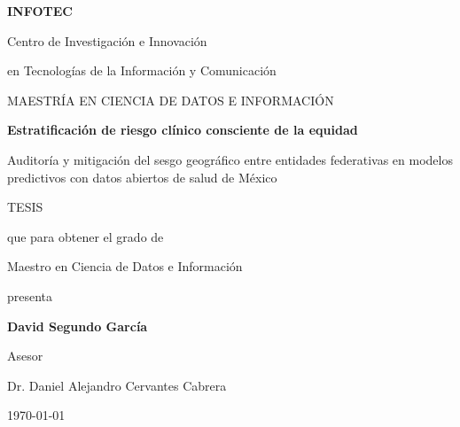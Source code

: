 \begin{titlepage}
\centering
\vspace*{0.8cm}

{\large\bfseries INFOTEC\par}
\vspace{0.2cm}
{\normalsize Centro de Investigación e Innovación\par}
{\normalsize en Tecnologías de la Información y Comunicación\par}
\vspace{1.1cm}
{\large MAESTRÍA EN CIENCIA DE DATOS E INFORMACIÓN\par}
\vspace{1.1cm}

{\LARGE\bfseries Estratificación de riesgo clínico consciente de la equidad\par}
\vspace{0.6cm}
{\large Auditoría y mitigación del sesgo geográfico entre entidades federativas
en modelos predictivos con datos abiertos de salud de México\par}

\vspace{1.1cm}
{\large TESIS\par}
\vspace{0.3cm}
{\normalsize que para obtener el grado de\par}
\vspace{0.3cm}
{\large Maestro en Ciencia de Datos e Información\par}
\vspace{0.3cm}
{\normalsize presenta\par}
\vspace{0.5cm}
{\Large\bfseries David Segundo García\par}

\vspace{1.2cm}
{\normalsize Asesor\par}
\vspace{0.3cm}
{\large Dr. Daniel Alejandro Cervantes Cabrera\par}

\vspace{1.0cm}
{\normalsize \today\par}
\end{titlepage}
